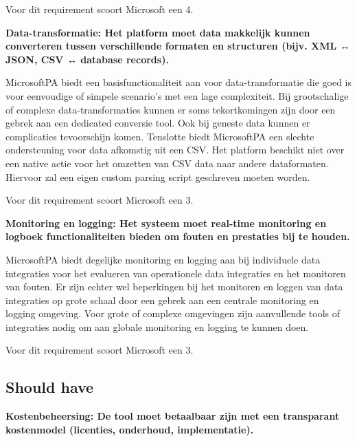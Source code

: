 Voor dit requirement scoort Microsoft een 4.

\vspace{\baselineskip}
\textbf{Data-transformatie: Het platform moet data makkelijk kunnen converteren tussen verschillende formaten en structuren (bijv. XML ↔ JSON, CSV ↔ database records).}

\vspace{\baselineskip}

MicrosoftPA biedt een basisfunctionaliteit aan voor data-transformatie die goed is voor eenvoudige of simpele scenario’s met een lage complexiteit. Bij grootschalige of complexe data-transformaties kunnen er soms tekortkomingen zijn door een gebrek aan een dedicated conversie tool. Ook bij geneste data kunnen er complicaties tevoorschijn komen. Tenslotte biedt MicrosoftPA een slechte ondersteuning voor data afkomstig uit een CSV. Het platform beschikt niet over een native actie voor het omzetten van CSV data naar andere dataformaten. Hiervoor zal een eigen custom parsing script geschreven moeten worden.

Voor dit requirement scoort Microsoft een 3.

\vspace{\baselineskip}


\textbf{Monitoring en logging: Het systeem moet real-time monitoring en logboek functionaliteiten bieden om fouten en prestaties bij te houden.}

\vspace{\baselineskip}

MicrosoftPA biedt degelijke monitoring en logging aan bij individuele data integraties voor het evalueren van operationele data integraties en het monitoren van fouten. Er zijn echter wel beperkingen bij het monitoren en loggen van data integraties op grote schaal door een gebrek aan een centrale monitoring en logging omgeving. Voor grote of complexe omgevingen zijn aanvullende tools of integraties nodig om aan globale monitoring en logging te kunnen doen.

Voor dit requirement scoort Microsoft een 3.

\vspace{\baselineskip}

\subsection{Should have}%
\label{ShouldHaveMicrosoft}

\textbf{Kostenbeheersing: De tool moet betaalbaar zijn met een transparant kostenmodel (licenties, onderhoud, implementatie).}

